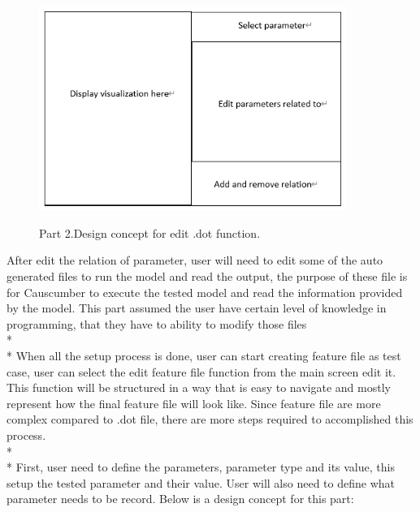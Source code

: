 \begin{figure}[H]
	\centering
	\includegraphics[width=10cm]{figures/editDot2.png}\\
	\caption{Part 2.Design concept for edit .dot function.}
	\label{fig:figure6}
\end{figure}
\noindent 
After edit the relation of parameter, user will need to edit some of the auto generated files to run the model and read the output, the purpose of these file is for Causcumber to execute the tested model and read the information provided by the model. This part assumed the user have certain level of knowledge in programming, that they have to ability to modify those files\\*\\*
When all the setup process is done, user can start creating feature file as test case, user can select the edit feature file function from the main screen edit it. This function will be structured in a way that is easy to navigate and mostly represent how the final feature file will look like. Since feature file are more complex compared to .dot file, there are more steps required to accomplished this process. \\*\\*
First, user need to define the parameters, parameter type and its value, this setup the tested parameter and their value. User will also need to define what parameter needs to be record. Below is a design concept for this part: 

